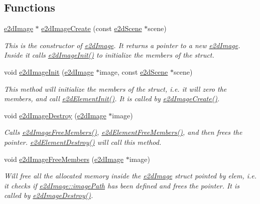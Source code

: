 \subsection*{Functions}
\begin{DoxyCompactItemize}
\item 
\hyperlink{structe2d_image}{e2d\-Image} $\ast$ \hyperlink{group__e2d_image_gafc7e085a237f8d2f1b147b3cca8259d6}{e2d\-Image\-Create} (const \hyperlink{structe2d_scene}{e2d\-Scene} $\ast$scene)
\begin{DoxyCompactList}\small\item\em This is the constructor of \hyperlink{structe2d_image}{e2d\-Image}. It returns a pointer to a new \hyperlink{structe2d_image}{e2d\-Image}. Inside it calls \hyperlink{group__e2d_image_ga11703b45867fb00d56489a3a6bc6bb9c}{e2d\-Image\-Init()} to initialize the members of the struct. \end{DoxyCompactList}\item 
void \hyperlink{group__e2d_image_ga11703b45867fb00d56489a3a6bc6bb9c}{e2d\-Image\-Init} (\hyperlink{structe2d_image}{e2d\-Image} $\ast$image, const \hyperlink{structe2d_scene}{e2d\-Scene} $\ast$scene)
\begin{DoxyCompactList}\small\item\em This method will initialize the members of the struct, i.\-e. it will zero the members, and call \hyperlink{group__e2d_element_ga8734d10ef40a380dfc51bfe1790a92a7}{e2d\-Element\-Init()}. It is called by \hyperlink{group__e2d_image_gafc7e085a237f8d2f1b147b3cca8259d6}{e2d\-Image\-Create()}. \end{DoxyCompactList}\item 
void \hyperlink{group__e2d_image_gacf174e48578f0e23888e37f47a3ef10b}{e2d\-Image\-Destroy} (\hyperlink{structe2d_image}{e2d\-Image} $\ast$image)
\begin{DoxyCompactList}\small\item\em Calls \hyperlink{group__e2d_image_gaf5409c0b10e8a8d8b9bd3f08e1d5da1f}{e2d\-Image\-Free\-Members()}, \hyperlink{group__e2d_element_gae8da5104d70a09549ca74044dda8313c}{e2d\-Element\-Free\-Members()}, and then frees the pointer. \hyperlink{group__e2d_element_ga214c437a16fe6f3fc795539f851a2019}{e2d\-Element\-Destroy()} will call this method. \end{DoxyCompactList}\item 
void \hyperlink{group__e2d_image_gaf5409c0b10e8a8d8b9bd3f08e1d5da1f}{e2d\-Image\-Free\-Members} (\hyperlink{structe2d_image}{e2d\-Image} $\ast$image)
\begin{DoxyCompactList}\small\item\em Will free all the allocated memory inside the \hyperlink{structe2d_image}{e2d\-Image} struct pointed by elem, i.\-e. it checks if \hyperlink{structe2d_image_afb14ab23ba86115c3b01ad4122943f89}{e2d\-Image\-::image\-Path} has been defined and frees the pointer. It is called by \hyperlink{group__e2d_image_gacf174e48578f0e23888e37f47a3ef10b}{e2d\-Image\-Destroy()}. \end{DoxyCompactList}\item 

\end{DoxyCompactItemize}
